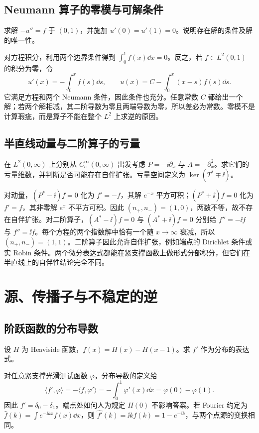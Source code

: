 \subsection*{Neumann 算子的零模与可解条件}
求解 \(-u''=f\) 于 \((0,1)\)，并施加 \(u'(0)=u'(1)=0\)。说明存在解的条件及解的唯一性。

对方程积分，利用两个边界条件得到 \(\int_0^1f(x)\dd x=0\)。反之，若 \(f\in L^2(0,1)\) 的积分为零，令
\[
u'(x)=-\int_0^x f(s)\dd s,\qquad
u(x)=C-\int_0^x(x-s)f(s)\dd s.
\]
它满足方程和两个 Neumann 条件，因此条件也充分。任意常数 \(C\) 都给出一个解；若两个解相减，其二阶导数为零且两端导数为零，所以差必为常数。零模不是计算瑕疵，而是算子不能在整个 \(L^2\) 上求逆的原因。

\subsection*{半直线动量与二阶算子的亏量}
在 \(L^2(0,\infty)\) 上分别从 \(C_c^\infty(0,\infty)\) 出发考虑 \(P=-\ii\partial_x\) 与 \(A=-\partial_x^2\)。求它们的亏量维数，并判断是否可能存在自伴扩张。亏量空间定义为 \(\ker(T^*\mp\ii)\)。

对动量，\((P^*-\ii)f=0\) 化为 \(f'=-f\)，其解 \(e^{-x}\) 平方可积；\((P^*+\ii)f=0\) 化为 \(f'=f\)，其非零解 \(e^x\) 不平方可积。因此 \((n_+,n_-)=(1,0)\)，两数不等，故不存在自伴扩张。对二阶算子，\((A^*-\ii)f=0\) 与 \((A^*+\ii)f=0\) 分别给 \(f''=-\ii f\) 与 \(f''=\ii f\)。每个方程的两个指数解中恰有一个随 \(x\to\infty\) 衰减，所以 \((n_+,n_-)=(1,1)\)。二阶算子因此允许自伴扩张，例如端点的 Dirichlet 条件或实 Robin 条件。两个微分表达式都能在紧支撑函数上做形式分部积分，但它们在半直线上的自伴性结论完全不同。

\section{源、传播子与不稳定的逆}

\subsection*{阶跃函数的分布导数}
设 \(H\) 为 Heaviside 函数，\(f(x)=H(x)-H(x-1)\)。求 \(f'\) 作为分布的表达式。

对任意紧支撑光滑测试函数 \(\varphi\)，分布导数的定义给
\[
\langle f',\varphi\rangle=-\langle f,\varphi'\rangle
=-\int_0^1\varphi'(x)\dd x
=\varphi(0)-\varphi(1).
\]
因此 \(f'=\delta_0-\delta_1\)。端点处如何人为规定 \(H(0)\) 不影响答案。若 Fourier 约定为 \(\widehat f(k)=\int e^{-\ii kx}f(x)\dd x\)，则 \(\widehat{f'}(k)=\ii k\widehat f(k)=1-e^{-\ii k}\)，与两个点源的变换相同。

